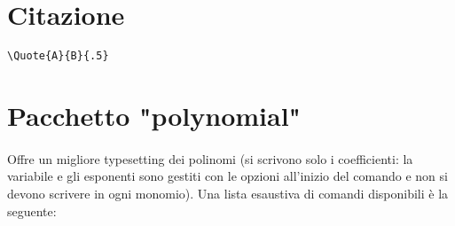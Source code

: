 \section{Citazione}
\begin{verbatim}
\Quote{A}{B}{.5}
\end{verbatim}
\section{Pacchetto "polynomial"}
\paragraph*{}Offre un migliore typesetting dei polinomi (si scrivono solo i coefficienti: la variabile e gli esponenti sono gestiti con le opzioni all'inizio del comando e non si devono scrivere in ogni monomio). Una lista esaustiva di comandi disponibili è la seguente:
